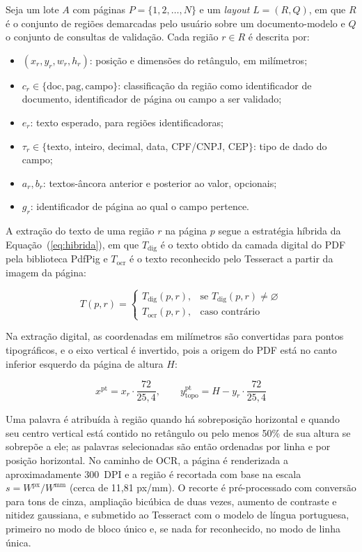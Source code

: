 \documentclass[article,12pt,oneside,a4paper,english,brazil]{abntex2}
\begin{document}
Seja um lote $A$ com páginas $P = \{1, 2, \ldots, N\}$ e um \textit{layout}
$L = (R, Q)$, em que $R$ é o conjunto de regiões demarcadas pelo usuário sobre um
documento-modelo e $Q$ o conjunto de consultas de validação. Cada região
$r \in R$ é descrita por:

\begin{itemize}
\item $(x_r, y_r, w_r, h_r)$: posição e dimensões do retângulo, em milímetros;
\item $c_r \in \{\mathrm{doc}, \mathrm{pag}, \mathrm{campo}\}$: classificação da região
  como identificador de documento, identificador de página ou campo a ser validado;
\item $e_r$: texto esperado, para regiões identificadoras;
\item $\tau_r \in \{$texto, inteiro, decimal, data, CPF/CNPJ, CEP$\}$: tipo de dado do campo;
\item $a_r, b_r$: textos-âncora anterior e posterior ao valor, opcionais;
\item $g_r$: identificador de página ao qual o campo pertence.
\end{itemize}

A extração do texto de uma região $r$ na página $p$ segue a estratégia híbrida da
Equação~(\ref{eq:hibrida}), em que $T_{\mathrm{dig}}$ é o texto obtido da camada
digital do PDF pela biblioteca PdfPig \cite{pdfpig} e $T_{\mathrm{ocr}}$ é o texto
reconhecido pelo Tesseract \cite{smith2007} a partir da imagem da página:

\begin{equation}\label{eq:hibrida}
T(p, r) =
\begin{cases}
T_{\mathrm{dig}}(p, r), & \text{se } T_{\mathrm{dig}}(p, r) \neq \varnothing \\
T_{\mathrm{ocr}}(p, r), & \text{caso contrário}
\end{cases}
\end{equation}

Na extração digital, as coordenadas em milímetros são convertidas para pontos
tipográficos, e o eixo vertical é invertido, pois a origem do PDF está no canto
inferior esquerdo da página de altura $H$:

\begin{equation}\label{eq:pontos}
x^{\mathrm{pt}} = x_r \cdot \frac{72}{25{,}4}, \qquad
y^{\mathrm{pt}}_{\mathrm{topo}} = H - y_r \cdot \frac{72}{25{,}4}
\end{equation}

Uma palavra é atribuída à região quando há sobreposição horizontal e quando seu
centro vertical está contido no retângulo ou pelo menos 50\% de sua altura se sobrepõe
a ele; as palavras selecionadas são então ordenadas por linha e por posição horizontal.
No caminho de OCR, a página é renderizada a aproximadamente 300~DPI
\cite{tessdocqualidade} e a região é recortada com base na escala
$s = W^{\mathrm{px}} / W^{\mathrm{mm}}$ (cerca de 11,81 px/mm). O recorte é
pré-processado com conversão para tons de cinza, ampliação bicúbica de duas vezes,
aumento de contraste e nitidez gaussiana, e submetido ao Tesseract com o modelo de
língua portuguesa, primeiro no modo de bloco único e, se nada for reconhecido, no modo
de linha única.
\end{document}
